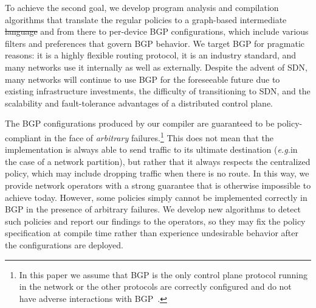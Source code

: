 \documentclass{sig-alternate-10pt}
\newcommand{\EG}{\emph{e.g.}}
\providecommand{\DIFadd}[1]{{\protect\color{blue}\uwave{#1}}} %
\providecommand{\DIFdel}[1]{{\protect\color{red}\sout{#1}}}                      %
\providecommand{\DIFaddbegin}{} %
\providecommand{\DIFaddend}{} %
\providecommand{\DIFdelbegin}{} %
\providecommand{\DIFdelend}{} %
\begin{document}

To achieve the second goal, we develop program analysis and compilation
algorithms that translate the regular policies to a graph-based
intermediate \DIFdelbegin \DIFdel{language }\DIFdelend \DIFaddbegin \DIFadd{representation }\DIFaddend and from there to per-device BGP configurations, which include various filters and preferences that govern BGP behavior.
We target BGP for pragmatic reasons:
it is a highly flexible routing protocol,
it is an industry standard,
and many networks use it internally as well as externally.
Despite the advent of SDN, many networks will continue to
use BGP for the foreseeable future due to existing infrastructure investments, the difficulty of transitioning to SDN, and the scalability and fault-tolerance advantages of a distributed
control plane.

The BGP configurations produced by our compiler are
guaranteed to be policy-compliant in the face of
{\em arbitrary} failures.\footnote{In this paper we assume that BGP is the only control plane protocol running in the network or the other protocols are correctly configured and do not have adverse interactions with BGP~\cite{igp-correctness1,igp-correctness2}.} This does not mean that the implementation is always
able to send traffic to its ultimate destination
(\EG in the case of a network partition), but rather that it always respects the
centralized policy, which may include dropping traffic when there is no route.
%
In this way, we provide network operators
with a strong guarantee that is otherwise impossible to achieve
today.
However, some policies simply cannot be implemented correctly in BGP in
 the presence of arbitrary failures.  We develop new
algorithms to detect such policies
and report our findings to the operators, so they may fix the policy
specification at compile time rather than experience undesirable
behavior after the configurations are deployed.
\end{document}
